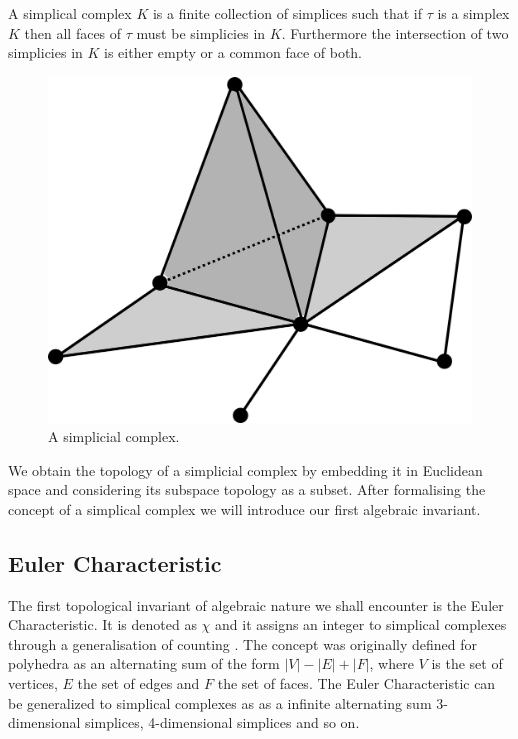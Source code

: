 \begin{defn} A simplical complex $K$ is a finite collection of simplices such that if $\tau$ is a simplex $K$ then all faces of $\tau$ must be simplicies in $K$. Furthermore the intersection of two simplicies in $K$ is either empty or a common face of both.  \end{defn}


\begin{figure}[h]%
    \centering
    \includegraphics[center, scale=0.03 ]{./images/simplex/complex.eps}
    \caption{A simplicial complex.}%
    \label{fig:case1.1}%
\end{figure}


We obtain the topology of a simplicial complex by embedding it in Euclidean space and considering its subspace topology as a subset. After formalising the concept of a simplical complex we will introduce our first algebraic invariant.


\subsection{Euler Characteristic}

The first topological invariant of algebraic nature we shall encounter is the Euler Characteristic. It is denoted as $\chi$ and it assigns an integer to simplical complexes through a generalisation of counting \cite[p. 44]{elementary-applied-topology}. The concept was originally defined for polyhedra as an alternating sum of the form $|V| - |E| + |F|$, where $V$ is the set of vertices, $E$ the set of edges and $F$ the set of faces. The Euler Characteristic can be generalized to simplical complexes as as a infinite alternating sum 3-dimensional simplices, 4-dimensional simplices and so on.

